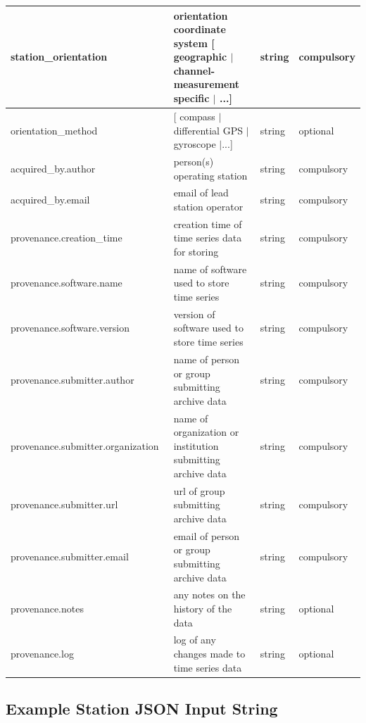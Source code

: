 \documentclass{article}
\begin{document}
\begin{table}[htb!]
\begin{tabular}{|l|p{3in}|l|l|}
        station\_orientation\ & orientation coordinate system [ geographic $|$ channel-measurement specific $|$ ...] & string & compulsory \\ \hline
        orientation\_method\ & [ compass $|$ differential GPS $|$ gyroscope $|$...] & string & optional \\ \hline
        acquired\_by.author\ & person(s) operating station & string & compulsory \\ \hline
        acquired\_by.email\ & email of lead station operator & string & compulsory \\ \hline
        provenance.creation\_time\ & creation time of time series data for storing & string & compulsory \\ \hline
        provenance.software.name\ & name of software used to store time series & string & compulsory \\ \hline
        provenance.software.version\ & version of software used to store time series & string & compulsory \\ \hline
        provenance.submitter.author\ & name of person or group submitting archive data & string & compulsory \\ \hline
        provenance.submitter.organization\ & name of organization or institution submitting archive data & string & compulsory \\ \hline
        provenance.submitter.url\ & url of group submitting archive data & string & compulsory \\ \hline
        provenance.submitter.email\ & email of person or group submitting archive data & string & compulsory  \\ \hline
        provenance.notes\ & any notes on the history of the data & string & optional \\ \hline
        provenance.log\ & log of any changes made to time series data & string & optional \\ \hline
    \end{tabular}
\label{tab:station01}
\end{table}    
   
\newpage
\subsection{Example Station JSON Input String}
\end{document}
